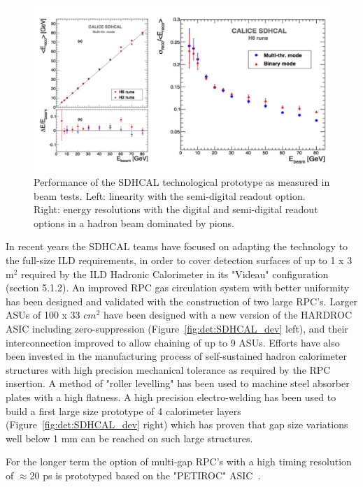 \begin{figure}[t!]
\centering
\includegraphics[width=1.0\hsize]{Detector/fig/SDHCAL_performance.jpg}
\caption{Performance of the SDHCAL technological prototype as measured in beam tests. Left: linearity with the semi-digital readout option. Right: energy resolutions with the digital and semi-digital readout options in a hadron beam dominated by pions.}
\label{fig:det:SDHCAL_perf}
\end{figure}

In recent years the SDHCAL teams have focused on adapting the technology to the full-size ILD requirements, in order to cover detection surfaces of up to 1 x 3 m$^2$ required by the ILD Hadronic Calorimeter in its "Videau" configuration (section 5.1.2). An improved RPC gas circulation system with better uniformity has been designed and validated with the construction of two large RPC's. Larger ASUs of 100 x 33 $cm^2$ have been designed with a new version of the HARDROC ASIC including zero-suppression (Figure~\ref{fig:det:SDHCAL_dev} left), and their interconnection improved to allow chaining of up to 9 ASUs. Efforts have also been invested in the manufacturing process of self-sustained hadron calorimeter structures with high precision mechanical tolerance as required by the RPC insertion. A method of "roller levelling" has been used to machine steel absorber plates with a high flatness. A high precision electro-welding has been used to build a first large size prototype of 4 calorimeter layers (Figure~\ref{fig:det:SDHCAL_dev} right) which has proven that gap size variations well below 1 mm can be reached on such large structures. 

For the longer term the option of multi-gap RPC's with a high timing resolution of $\approx$20 ps is prototyped based on the "PETIROC" ASIC~\cite{Fleury:2014hfa}. 


